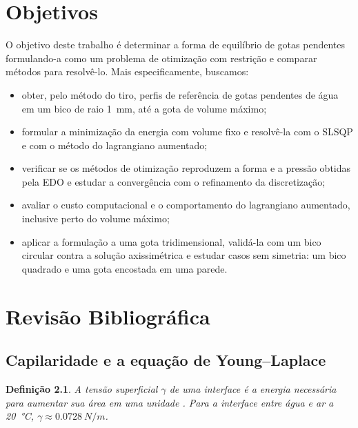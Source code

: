 \documentclass[12pt, oneside, a4paper, english, brazil]{abntex2}
\theoremstyle{relatorio}
\newtheorem{definicao}{Definição}[section]
\theoremstyle{relatorioit}
\theoremstyle{problema}
\begin{document}
\chapter{Objetivos}

O objetivo deste trabalho é determinar a forma de equilíbrio de gotas pendentes
formulando-a como um problema de otimização com restrição e comparar métodos para
resolvê-lo. Mais especificamente, buscamos:

\begin{itemize}
  \item obter, pelo método do tiro, perfis de referência de gotas pendentes de água
    em um bico de raio \qty{1}{mm}, até a gota de volume máximo;
  \item formular a minimização da energia com volume fixo e resolvê-la com o SLSQP e
    com o método do lagrangiano aumentado;
  \item verificar se os métodos de otimização reproduzem a forma e a pressão obtidas
    pela EDO e estudar a convergência com o refinamento da discretização;
  \item avaliar o custo computacional e o comportamento do lagrangiano aumentado,
    inclusive perto do volume máximo;
  \item aplicar a formulação a uma gota tridimensional, validá-la com um bico
    circular contra a solução axissimétrica e estudar casos sem simetria: um bico
    quadrado e uma gota encostada em uma parede.
\end{itemize}

\chapter{Revisão Bibliográfica}

\section{Capilaridade e a equação de Young--Laplace}

\begin{definicao}
A tensão superficial $\gamma$ de uma interface é a energia necessária para aumentar
sua área em uma unidade \parencite{degennes2004}. Para a interface entre água e ar a
\qty{20}{\celsius}, $\gamma \approx \qty{0.0728}{N/m}$.
\end{definicao}
\end{document}
